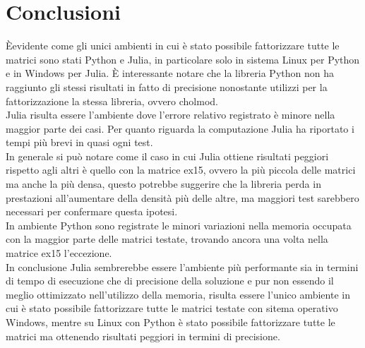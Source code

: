 \documentclass[a4paper, 12pt]{article}
\begin{document}
\section{Conclusioni}
\`Eevidente come gli unici ambienti in cui è stato possibile
fattorizzare tutte le matrici sono stati Python e Julia, in particolare solo in
sistema Linux per Python e in Windows per Julia.
\`E interessante notare che la libreria Python non ha raggiunto gli stessi
risultati in fatto di precisione nonostante utilizzi per la fattorizzazione la
stessa libreria, ovvero cholmod.\\
Julia risulta essere l'ambiente dove l'errore relativo registrato è minore nella
maggior parte dei casi.
Per quanto riguarda la computazione Julia ha riportato i tempi più brevi in
quasi ogni test.\\
In generale si può notare come il caso in cui Julia ottiene risultati peggiori
rispetto agli altri è quello con la matrice ex15, ovvero la più piccola delle
matrici ma anche la più densa, questo potrebbe suggerire che la libreria perda
in prestazioni all'aumentare della densità più delle altre, ma maggiori test
sarebbero necessari per confermare questa ipotesi.\\
In ambiente Python sono registrate le minori variazioni nella memoria occupata
con la maggior parte delle matrici testate, trovando ancora una volta nella
matrice ex15 l'eccezione.\\
In conclusione Julia sembrerebbe essere l'ambiente più performante sia in
termini di tempo di esecuzione che di precisione della soluzione e pur non
essendo il meglio ottimizzato nell'utilizzo della memoria, risulta essere
l'unico ambiente in cui è stato possibile fattorizzare tutte le matrici testate
con sitema operativo Windows, mentre su Linux con Python è stato possibile
fattorizzare tutte le matrici ma ottenendo risultati peggiori in termini di
precisione.
\end{document}
